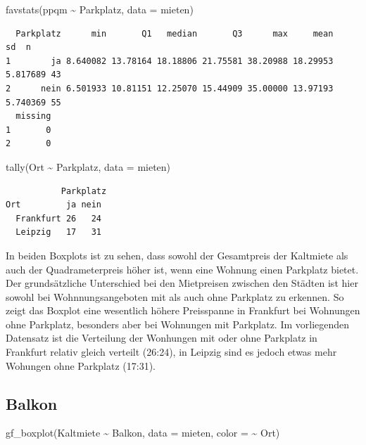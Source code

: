 \documentclass[
  a4paper,
  DIV=11]{scrartcl}
\newenvironment{Shaded}{\begin{snugshade}}{\end{snugshade}}
\newcommand{\AttributeTok}[1]{\textcolor[rgb]{0.40,0.45,0.13}{#1}}
\newcommand{\FunctionTok}[1]{\textcolor[rgb]{0.28,0.35,0.67}{#1}}
\newcommand{\NormalTok}[1]{\textcolor[rgb]{0.00,0.23,0.31}{#1}}
\newcommand{\SpecialCharTok}[1]{\textcolor[rgb]{0.37,0.37,0.37}{#1}}
\begin{document}
\begin{Shaded}
\begin{Highlighting}[]
\FunctionTok{favstats}\NormalTok{(ppqm }\SpecialCharTok{\textasciitilde{}}\NormalTok{ Parkplatz, }\AttributeTok{data =}\NormalTok{ mieten)}
\end{Highlighting}
\end{Shaded}

\begin{verbatim}
  Parkplatz      min       Q1   median       Q3      max     mean       sd  n
1        ja 8.640082 13.78164 18.18806 21.75581 38.20988 18.29953 5.817689 43
2      nein 6.501933 10.81151 12.25070 15.44909 35.00000 13.97193 5.740369 55
  missing
1       0
2       0
\end{verbatim}

\begin{Shaded}
\begin{Highlighting}[]
\FunctionTok{tally}\NormalTok{(Ort }\SpecialCharTok{\textasciitilde{}}\NormalTok{ Parkplatz, }\AttributeTok{data =}\NormalTok{ mieten)}
\end{Highlighting}
\end{Shaded}

\begin{verbatim}
           Parkplatz
Ort         ja nein
  Frankfurt 26   24
  Leipzig   17   31
\end{verbatim}

In beiden Boxplots ist zu sehen, dass sowohl der Gesamtpreis der
Kaltmiete als auch der Quadrameterpreis höher ist, wenn eine Wohnung
einen Parkplatz bietet.\\
Der grundsätzliche Unterschied bei den Mietpreisen zwischen den Städten
ist hier sowohl bei Wohnnungsangeboten mit als auch ohne Parkplatz zu
erkennen. So zeigt das Boxplot eine wesentlich höhere Preisspanne in
Frankfurt bei Wohnungen ohne Parkplatz, besonders aber bei Wohnungen mit
Parkplatz. Im vorliegenden Datensatz ist die Verteilung der Wonhungen
mit oder ohne Parkplatz in Frankfurt relativ gleich verteilt (26:24), in
Leipzig sind es jedoch etwas mehr Wohungen ohne Parkplatz (17:31).

\hypertarget{balkon}{%
\subsection{Balkon}\label{balkon}}

\begin{Shaded}
\begin{Highlighting}[]
\FunctionTok{gf\_boxplot}\NormalTok{(Kaltmiete }\SpecialCharTok{\textasciitilde{}}\NormalTok{ Balkon, }\AttributeTok{data =}\NormalTok{ mieten, }\AttributeTok{color =} \SpecialCharTok{\textasciitilde{}}\NormalTok{ Ort)}
\end{Highlighting}
\end{Shaded}
\end{document}
